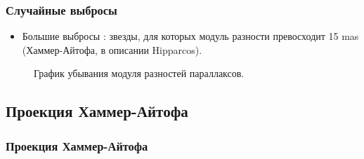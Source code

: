 \documentclass[12pt,aspectratio=43]{beamer}
\begin{document}
\begin{frame}
\frametitle{Случайные выбросы}
\begin{block}{}
\begin{itemize}
  \item[  ] Большие выбросы : звезды, для которых модуль разности превосходит 15 mas (Хаммер-Айтофа, в описании Hipparcos).
\end{itemize}
\end{block}

\begin{figure}[h!]
\caption{График убывания модуля разностей параллаксов.}
\end{figure}

\end{frame}

\subsection{Проекция Хаммер-Айтофа}\label{sub:hammer}

\begin{frame}[<alignment>]
\frametitle{Проекция Хаммер-Айтофа}
\begin{figure}[h!]
\label{img:hammtiss}
\end{figure}
\end{frame}	
\end{document}
